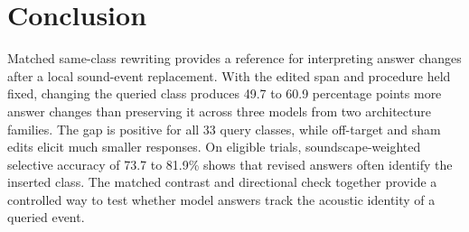 \section{Conclusion}
\label{sec:discussion}

Matched same-class rewriting provides a reference for interpreting answer
changes after a local sound-event replacement. With the edited span and
procedure held fixed, changing the queried class produces 49.7 to 60.9
percentage points more answer changes than preserving it across three models
from two architecture families. The gap is positive for all 33 query classes,
while off-target and sham edits elicit much smaller responses. On eligible
trials, soundscape-weighted selective accuracy of 73.7 to 81.9\% shows that
revised answers often identify the inserted class. The matched contrast and
directional check together provide a controlled way to test whether model
answers track the acoustic identity of a queried event.
